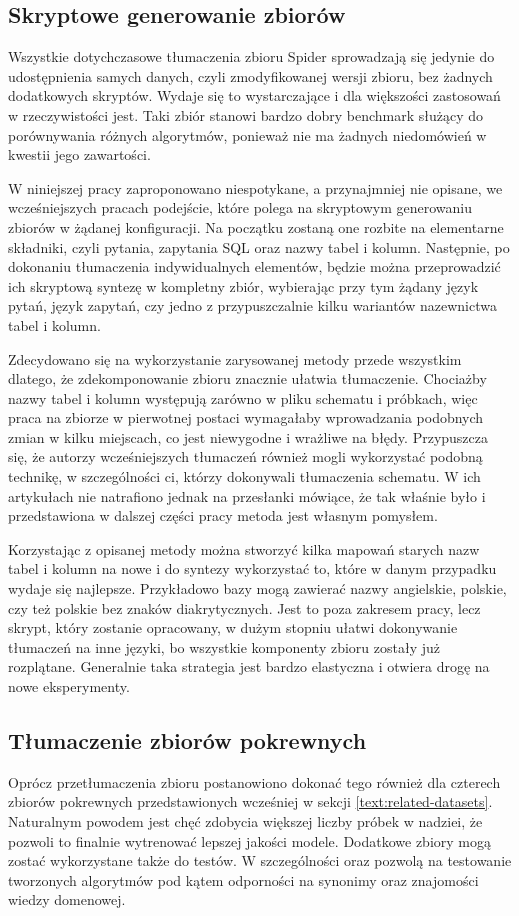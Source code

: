 \subsection{Skryptowe generowanie zbiorów}
Wszystkie dotychczasowe tłumaczenia zbioru Spider sprowadzają się jedynie do udostępnienia samych danych, czyli zmodyfikowanej wersji zbioru, bez żadnych dodatkowych skryptów. Wydaje się to wystarczające i dla większości zastosowań w rzeczywistości jest. Taki zbiór stanowi bardzo dobry benchmark służący do porównywania różnych algorytmów, ponieważ nie ma żadnych niedomówień w kwestii jego zawartości.

W niniejszej pracy zaproponowano niespotykane, a przynajmniej nie opisane, we wcześniejszych pracach podejście, które polega na skryptowym generowaniu zbiorów w żądanej konfiguracji. Na początku zostaną one rozbite na elementarne składniki, czyli pytania, zapytania SQL oraz nazwy tabel i kolumn. Następnie, po dokonaniu tłumaczenia indywidualnych elementów, będzie można przeprowadzić ich skryptową syntezę w kompletny zbiór, wybierając przy tym żądany język pytań, język zapytań, czy jedno z przypuszczalnie kilku wariantów nazewnictwa tabel i kolumn. 

Zdecydowano się na wykorzystanie zarysowanej metody przede wszystkim dlatego, że zdekomponowanie zbioru znacznie ułatwia tłumaczenie. Chociażby nazwy tabel i kolumn występują zarówno w pliku schematu i próbkach, więc praca na zbiorze w pierwotnej postaci wymagałaby wprowadzania podobnych zmian w kilku miejscach, co jest niewygodne i wrażliwe na błędy. Przypuszcza się, że autorzy wcześniejszych tłumaczeń również mogli wykorzystać podobną technikę, w szczególności ci, którzy dokonywali tłumaczenia schematu. W ich artykułach nie natrafiono jednak na przesłanki mówiące, że tak właśnie było i przedstawiona w dalszej części pracy metoda jest własnym pomysłem.

Korzystając z opisanej metody można stworzyć kilka mapowań starych nazw tabel i kolumn na nowe i do syntezy wykorzystać to, które w danym przypadku wydaje się najlepsze. Przykładowo bazy mogą zawierać nazwy angielskie, polskie, czy też polskie bez znaków diakrytycznych. Jest to poza zakresem pracy, lecz skrypt, który zostanie opracowany, w dużym stopniu ułatwi dokonywanie tłumaczeń na inne języki, bo wszystkie komponenty zbioru  zostały już rozplątane. Generalnie taka strategia jest bardzo elastyczna i otwiera drogę na nowe eksperymenty.

\subsection{Tłumaczenie zbiorów pokrewnych}
Oprócz przetłumaczenia zbioru  postanowiono dokonać tego również dla czterech zbiorów pokrewnych przedstawionych wcześniej w sekcji \ref{text:related-datasets}. Naturalnym powodem jest chęć zdobycia większej liczby próbek w nadziei, że pozwoli to finalnie wytrenować lepszej jakości modele. Dodatkowe zbiory mogą zostać wykorzystane także do testów. W szczególności  oraz  pozwolą na testowanie tworzonych algorytmów pod kątem odporności na synonimy oraz znajomości wiedzy domenowej. 

